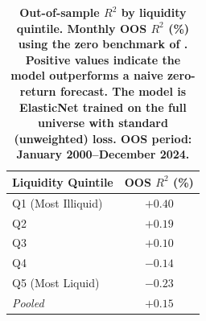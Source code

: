 \begin{table}[t!]
\centering
\begin{tabular}{l c}
\midrule
Liquidity Quintile & OOS $R^2$ (\%) \\
\midrule
Q1 (Most Illiquid) & $\mathbf{+0.40}$ \\
Q2                 & $+0.19$ \\
Q3                 & $+0.10$ \\
Q4                 & $\mathbf{-0.14}$ \\
Q5 (Most Liquid)   & $\mathbf{-0.23}$ \\[4pt]
\emph{Pooled}      & \emph{$+0.15$} \\
\midrule
\end{tabular}
\caption{\footnotesize \bf Out-of-sample $R^2$ by liquidity quintile\normalfont. Monthly OOS $R^2$ (\%) using the zero benchmark of \citet{gu2020empirical}. Positive values indicate the model outperforms a naive zero-return forecast. The model is ElasticNet trained on the full universe with standard (unweighted) loss. OOS period: January 2000--December 2024.}
\label{tab:r2_by_quintile}
\end{table}
